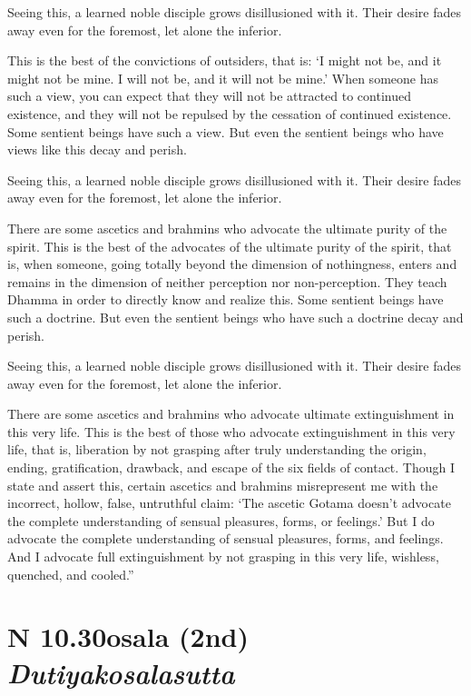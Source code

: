 \documentclass[12pt,openany]{book}%
\newcommand*{\suttatitleacronym}[1]{\smaller[2]{#1}\vspace*{.3em}}
\newcommand*{\suttatitletranslation}[1]{\linebreak{#1}}
\newcommand*{\suttatitleroot}[1]{\linebreak\smaller[2]\itshape{#1}}
\newcommand*{\tocacronym}[1]{\hspace*{-3.3em}{#1}\quad}
\newcommand*{\toctranslation}[1]{#1}
\newcommand*{\tocroot}[1]{(\textit{#1})}
\begin{document}
Seeing this, a learned noble disciple grows disillusioned with it. Their desire fades away even for the foremost, let alone the inferior. 

This is the best of the convictions of outsiders, that is: ‘I might not be, and it might not be mine. I will not be, and it will not be mine.’ When someone has such a view, you can expect that they will not be attracted to continued existence, and they will not be repulsed by the cessation of continued existence. Some sentient beings have such a view. But even the sentient beings who have views like this decay and perish. 

Seeing this, a learned noble disciple grows disillusioned with it. Their desire fades away even for the foremost, let alone the inferior. 

There are some ascetics and brahmins who advocate the ultimate purity of the spirit. This is the best of the advocates of the ultimate purity of the spirit, that is, when someone, going totally beyond the dimension of nothingness, enters and remains in the dimension of neither perception nor non-perception. They teach Dhamma in order to directly know and realize this. Some sentient beings have such a doctrine. But even the sentient beings who have such a doctrine decay and perish. 

Seeing this, a learned noble disciple grows disillusioned with it. Their desire fades away even for the foremost, let alone the inferior. 

There are some ascetics and brahmins who advocate ultimate extinguishment in this very life. This is the best of those who advocate extinguishment in this very life, that is, liberation by not grasping after truly understanding the origin, ending, gratification, drawback, and escape of the six fields of contact. Though I state and assert this, certain ascetics and brahmins misrepresent me with the incorrect, hollow, false, untruthful claim: ‘The ascetic Gotama doesn’t advocate the complete understanding of sensual pleasures, forms, or feelings.’ But I do advocate the complete understanding of sensual pleasures, forms, and feelings. And I advocate full extinguishment by not grasping in this very life, wishless, quenched, and cooled.” 

%
\section*{{\suttatitleacronym AN 10.30}{\suttatitletranslation Kosala (2nd) }{\suttatitleroot Dutiyakosalasutta}}
\addcontentsline{toc}{section}{\tocacronym{AN 10.30} \toctranslation{Kosala (2nd) } \tocroot{Dutiyakosalasutta}}
\end{document}
